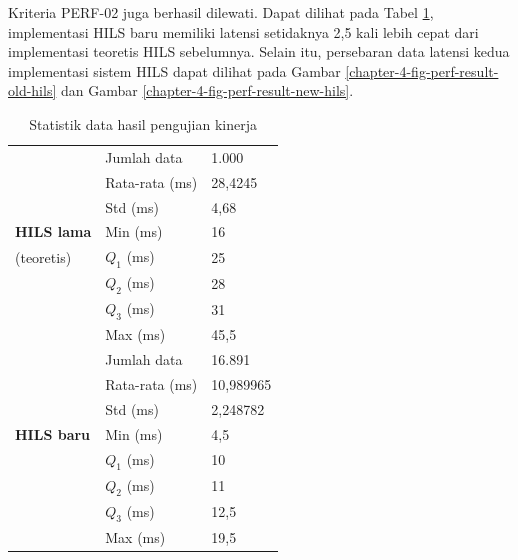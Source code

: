 Kriteria PERF-02 juga berhasil dilewati. Dapat dilihat pada Tabel
\ref{chapter-4-tbl-perf-result-statistics}, implementasi HILS baru memiliki
latensi setidaknya 2,5 kali lebih cepat dari implementasi teoretis HILS
sebelumnya. Selain itu, persebaran data latensi kedua implementasi sistem HILS
dapat dilihat pada Gambar \ref{chapter-4-fig-perf-result-old-hils} dan Gambar
\ref{chapter-4-fig-perf-result-new-hils}.
\begin{table}[!htbp]
	\begin{center}
		\begin{tabular}{|l|l|l|}
			\hline
			                   & Jumlah data    & 1.000     \\
			\cline{2-3}
			                   & Rata-rata (ms) & 28,4245   \\
			\cline{2-3}
			                   & Std (ms)       & 4,68      \\
			\cline{2-3}
			\textbf{HILS lama} & Min (ms)       & 16        \\
			\cline{2-3}
			(teoretis)         & $Q_1$ (ms)     & 25        \\
			\cline{2-3}
			                   & $Q_2$ (ms)     & 28        \\
			\cline{2-3}
			                   & $Q_3$ (ms)     & 31        \\
			\cline{2-3}
			                   & Max (ms)       & 45,5      \\
			\cline{2-3}
			\hline

			\hline
			                   & Jumlah data    & 16.891    \\
			\cline{2-3}
			                   & Rata-rata (ms) & 10,989965 \\
			\cline{2-3}
			                   & Std (ms)       & 2,248782  \\
			\cline{2-3}
			\textbf{HILS baru} & Min (ms)       & 4,5       \\
			\cline{2-3}
			                   & $Q_1$ (ms)     & 10        \\
			\cline{2-3}
			                   & $Q_2$ (ms)     & 11        \\
			\cline{2-3}
			                   & $Q_3$ (ms)     & 12,5      \\
			\cline{2-3}
			                   & Max (ms)       & 19,5      \\
			\cline{2-3}
			\hline
		\end{tabular}
	\end{center}

	\caption{Statistik data hasil pengujian kinerja}
	\label{chapter-4-tbl-perf-result-statistics}
\end{table}
